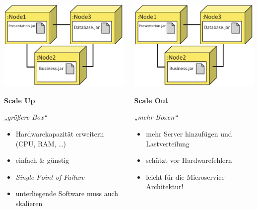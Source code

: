 \documentclass{beamer}
\begin{document}
\begin{frame}{\insertsubsection}
	\begin{columns}[T]
		\begin{column}{.5\textwidth}
			\centering
			\includegraphics[width=.6\textwidth, page=2]{img/scale-up-out.pdf}
			
			\textbf{\large\color{leuchtrot} Scale Up}
			
			\textit{„größere Box“}
			\begin{itemize}
				\item Hardwarekapazität erweitern (CPU, RAM, …)
				\item einfach \& günstig
				\item \textit{Single Point of Failure}
				\item unterliegende Software muss auch skalieren
			\end{itemize}
		\end{column}
		\begin{column}{.5\textwidth}
			\centering
			\includegraphics[width=.6\textwidth, page=1]{img/scale-up-out.pdf}
			
			\textbf{\large\color{leuchtrot} Scale Out}
			
			\textit{„mehr Boxen“}
			\begin{itemize}
				\item mehr Server hinzufügen und Lastverteilung
				\item schützt vor Hardwarefehlern
				\item leicht für die Microservice-Architektur!
			\end{itemize}
		\end{column}
	\end{columns}
	\vfill
	\hfill{\footnotesize\cite{Meier+08}}
\end{frame}
	
\end{document}
